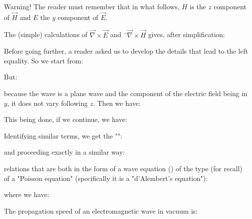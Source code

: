 	\begin{tcolorbox}[title=Remark,colframe=black,arc=10pt]
	Warning! The reader must remember that in what follows, $H$ is the $z$ component of $\vec{H}$ and $E$ the $y$ component of $\vec{E}$.
	\end{tcolorbox}
	The (simple) calculations of $\vec{\nabla}\times\vec{E}$ and $¨\vec{\nabla}\times\vec{H}$ gives, after simplification:
	
	Before going further, a reader asked us to develop the details that lead to the left equality. So we start from:
	
	But:
	
	because the wave is a plane wave and the component of the electric field being in $y$, it does not vary following $z$. Then we have:
	
	This being done, if we continue, we have:
	
	Identifying similar terms, we get the "":
	
	and proceeding exactly in a similar way:
	
	relations that are both in the form of a wave equation () of the type (for recall) of a "Poisson equation" (specifically it is a "d'Alembert's equation"):
	
	where we have:
	
	The propagation speed of an electromagnetic wave in vacuum is:
	
